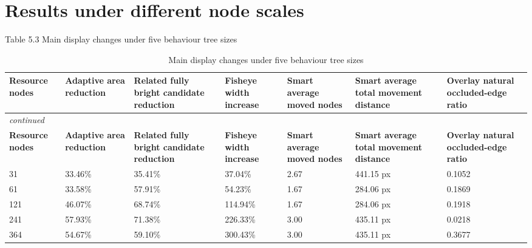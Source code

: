 \section{Results under different node scales}

Table 5.3 Main display changes under five behaviour tree sizes

\begin{center}

\begin{longtable}{@{}p{} p{} p{} p{} p{} p{} p{}@{}}
\caption{Main display changes under five behaviour tree sizes}\label{tab:tree-size-results}\\
\toprule
\textbf{Resource nodes} & \textbf{Adaptive area reduction} & \textbf{Related fully bright candidate reduction} & \textbf{Fisheye width increase} & \textbf{Smart average moved nodes} & \textbf{Smart average total movement distance} & \textbf{Overlay natural occluded-edge ratio} \\
\midrule
\endfirsthead
\multicolumn{7}{l}{\itshape continued}\\
\toprule
\textbf{Resource nodes} & \textbf{Adaptive area reduction} & \textbf{Related fully bright candidate reduction} & \textbf{Fisheye width increase} & \textbf{Smart average moved nodes} & \textbf{Smart average total movement distance} & \textbf{Overlay natural occluded-edge ratio} \\
\midrule
\endhead
31 & 33.46\% & 35.41\% & 37.04\% & 2.67 & 441.15 px & 0.1052 \\
61 & 33.58\% & 57.91\% & 54.23\% & 1.67 & 284.06 px & 0.1869 \\
121 & 46.07\% & 68.74\% & 114.94\% & 1.67 & 284.06 px & 0.1918 \\
241 & 57.93\% & 71.38\% & 226.33\% & 3.00 & 435.11 px & 0.0218 \\
364 & 54.67\% & 59.10\% & 300.43\% & 3.00 & 435.11 px & 0.3677 \\
\bottomrule
\end{longtable}


\end{center}
